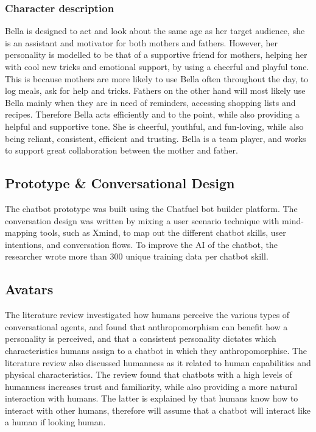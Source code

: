    \subsubsection{Character description}
    Bella is designed to act and look about the same age as her target audience, she is an assistant and motivator for both mothers and fathers. However, her personality is modelled to be that of a supportive friend for mothers, helping her with cool new tricks and emotional support, by using a cheerful and playful tone. This is because mothers are more likely to use Bella often throughout the day, to log meals, ask for help and tricks. Fathers on the other hand will most likely use Bella mainly when they are in need of reminders, accessing shopping lists and recipes. Therefore Bella acts efficiently and to the point, while also providing a helpful and supportive tone. She is cheerful, youthful, and fun-loving, while also being reliant, consistent, efficient and trusting. Bella is a team player, and works to support great collaboration between the mother and father. 

\vspace{5mm}

    \subsection{Prototype \& Conversational Design}
    The chatbot prototype was built using the Chatfuel bot builder platform. The conversation design was written by mixing a user scenario technique with mind-mapping tools, such as Xmind, to map out the different chatbot skills, user intentions, and conversation flows. To improve the AI of the chatbot, the researcher wrote more than 300 unique training data per chatbot skill.
        
\vspace{5mm}

    \subsection{Avatars}
    The literature review investigated how humans perceive the various types of conversational agents, and found that anthropomorphism can benefit how a personality is perceived, and that a consistent personality dictates which characteristics humans assign to a chatbot in which they anthropomorphise. The literature review also discussed humanness as it related to human capabilities and physical characteristics. The review found that chatbots with a high levels of humanness increases trust and familiarity, while also providing a more natural interaction with humans. The latter is explained by that humans know how to interact with other humans, therefore will assume that a chatbot will interact like a human if looking human. 
        
